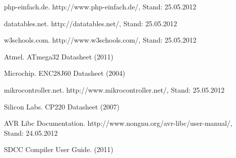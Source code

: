 \documentclass[a4paper,14pt,headsepline]{scrartcl}
\begin{document}
\newpage
php-einfach.de.\newline
http://www.php-einfach.de/, Stand: 25.05.2012

datatables.net.\newline
http://datatables.net/, Stand: 25.05.2012

w3schools.com.\newline
http://www.w3schools.com/, Stand: 25.05.2012

Atmel. ATmega32 Datasheet (2011)

Microchip. ENC28J60 Datasheet (2004)

mikrocontroller.net.\newline
http://www.mikrocontroller.net/, Stand: 25.05.2012

Silicon Labs. CP220 Datasheet (2007)

AVR Libc Documentation.\newline
http://www.nongnu.org/avr-libc/user-manual/, Stand: 24.05.2012

SDCC Compiler User Guide. (2011)
\end{document}
